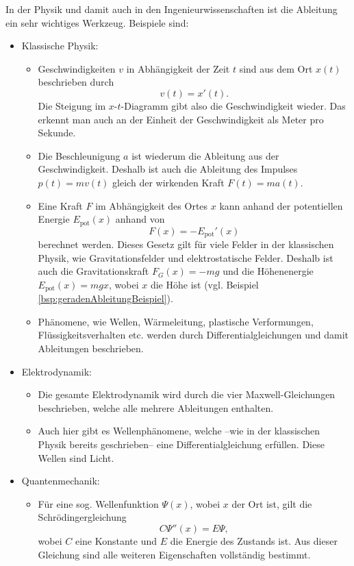 \documentclass[../../main.tex]{subfiles}
\begin{document}
    \begin{example}
        In der Physik und damit auch in den Ingenieurwissenschaften ist die Ableitung ein sehr wichtiges Werkzeug. Beispiele sind:
        \begin{itemize}
        \item Klassische Physik:
            \begin{itemize}
                \item Geschwindigkeiten $v$ in Abhängigkeit der Zeit $t$ sind aus dem Ort $x(t)$ beschrieben durch $$v(t) = x'(t).$$ Die Steigung im $x$-$t$-Diagramm gibt also die Geschwindigkeit wieder. Das erkennt man auch an der Einheit der Geschwindigkeit als Meter pro Sekunde.
                \item Die Beschleunigung $a$ ist wiederum die Ableitung aus der Geschwindigkeit. Deshalb ist auch die Ableitung des Impulses $p(t) = mv(t)$ gleich der wirkenden Kraft $F(t) = ma(t)$.
                \item Eine Kraft $F$ im Abhängigkeit des Ortes $x$ kann anhand der potentiellen Energie $E_\text{pot}(x)$ anhand von $$F(x)=-E_\text{pot}'(x)$$ berechnet werden. Dieses Gesetz gilt für viele Felder in der klassischen Physik, wie Gravitationsfelder und elektrostatische Felder. Deshalb ist auch die Gravitationskraft $F_G(x)=-mg$ und die Höhenenergie $E_\text{pot}(x)=mgx$, wobei $x$ die Höhe ist (vgl. Beispiel \ref{bsp:geradenAbleitungBeispiel}).
                \item Phänomene, wie Wellen, Wärmeleitung, plastische Verformungen, Flüssigkeitsverhalten etc. werden durch Differentialgleichungen und damit Ableitungen beschrieben.
            \end{itemize}
        \item Elektrodynamik:
        \begin{itemize}
            \item Die gesamte Elektrodynamik wird durch die vier Maxwell-Gleichungen beschrieben, welche alle mehrere Ableitungen enthalten.
            \item Auch hier gibt es Wellenphänomene, welche --wie in der klassischen Physik bereits geschrieben-- eine Differentialgleichung erfüllen. Diese Wellen sind Licht.
        \end{itemize}
        \item Quantenmechanik:
        \begin{itemize}
            \item Für eine sog. Wellenfunktion $\Psi(x)$, wobei $x$ der Ort ist, gilt die Schrödingergleichung $$C\Psi''(x) = E\Psi,$$ wobei $C$ eine Konstante und $E$ die Energie des Zustands ist. Aus dieser Gleichung sind alle weiteren Eigenschaften vollständig bestimmt.

\end{itemize}
\end{itemize}
\end{example}
\end{document}
